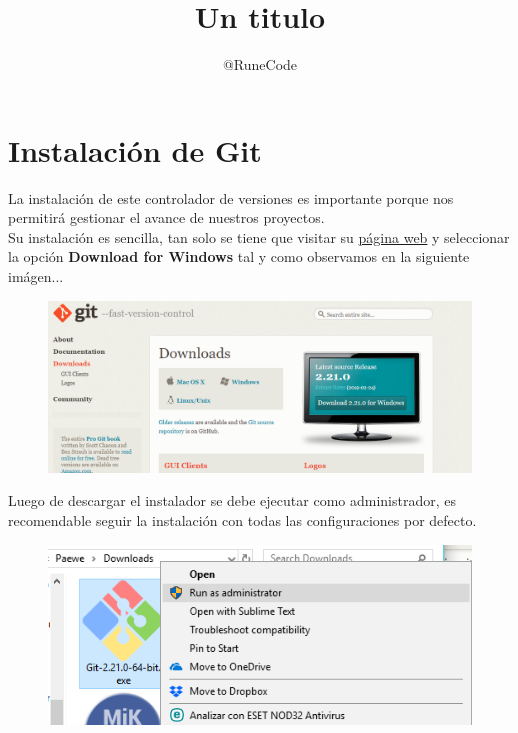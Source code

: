 \documentclass{article}
\title{Un titulo}
\author{@RuneCode}
\begin{document}


\section{Instalación de Git}%
La instalación de este controlador de versiones es importante porque nos
permitirá gestionar el avance de nuestros proyectos.\\

Su instalación es sencilla, tan solo se tiene que visitar su
\href{https://git-scm.com/}{página web} y seleccionar la opción
\textbf{Download for Windows} tal y como observamos en la siguiente imágen...

\begin{figure}[h!]
  \centering
  \includegraphics[scale=0.5]{./imagenes/Gitbash.png}
\end{figure}

Luego de descargar el instalador se debe ejecutar como administrador, es recomendable seguir
la instalación con todas las configuraciones por defecto.

\begin{figure}[h!]
  \centering
  \includegraphics[scale=0.75]{./imagenes/Gitbash2.png}
\end{figure}
\end{document}
